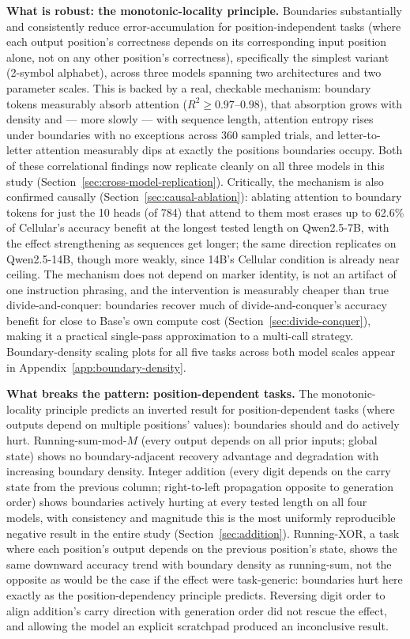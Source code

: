 \documentclass[11pt]{article}
\begin{document}
\textbf{What is robust: the monotonic-locality principle.} Boundaries substantially and consistently reduce error-accumulation for position-independent tasks (where each output position's correctness depends on its corresponding input position alone, not on any other position's correctness), specifically the simplest variant (2-symbol alphabet), across three models spanning two architectures and two parameter scales. This is backed by a real, checkable mechanism: boundary tokens measurably absorb attention ($R^2 \geq 0.97$--$0.98$), that absorption grows with density and --- more slowly --- with sequence length, attention entropy rises under boundaries with no exceptions across 360 sampled trials, and letter-to-letter attention measurably dips at exactly the positions boundaries occupy. Both of these correlational findings now replicate cleanly on all three models in this study (Section~\ref{sec:cross-model-replication}). Critically, the mechanism is also confirmed causally (Section~\ref{sec:causal-ablation}): ablating attention to boundary tokens for just the 10 heads (of 784) that attend to them most erases up to 62.6\% of Cellular's accuracy benefit at the longest tested length on Qwen2.5-7B, with the effect strengthening as sequences get longer; the same direction replicates on Qwen2.5-14B, though more weakly, since 14B's Cellular condition is already near ceiling. The mechanism does not depend on marker identity, is not an artifact of one instruction phrasing, and the intervention is measurably cheaper than true divide-and-conquer: boundaries recover much of divide-and-conquer's accuracy benefit for close to Base's own compute cost (Section~\ref{sec:divide-conquer}), making it a practical single-pass approximation to a multi-call strategy. Boundary-density scaling plots for all five tasks across both model scales appear in Appendix~\ref{app:boundary-density}.

\textbf{What breaks the pattern: position-dependent tasks.} The monotonic-locality principle predicts an inverted result for position-dependent tasks (where outputs depend on multiple positions' values): boundaries should and do actively hurt. Running-sum-mod-$M$ (every output depends on all prior inputs; global state) shows no boundary-adjacent recovery advantage and degradation with increasing boundary density. Integer addition (every digit depends on the carry state from the previous column; right-to-left propagation opposite to generation order) shows boundaries actively hurting at every tested length on all four models, with consistency and magnitude this is the most uniformly reproducible negative result in the entire study (Section~\ref{sec:addition}). Running-XOR, a task where each position's output depends on the previous position's state, shows the same downward accuracy trend with boundary density as running-sum, not the opposite as would be the case if the effect were task-generic: boundaries hurt here exactly as the position-dependency principle predicts. Reversing digit order to align addition's carry direction with generation order did not rescue the effect, and allowing the model an explicit scratchpad produced an inconclusive result.
\end{document}
